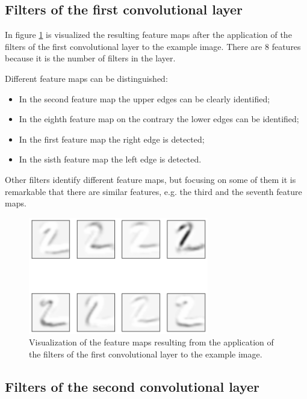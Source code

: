 \subsection{Filters of the first convolutional layer}

In figure \ref{fig:outputLev1} is visualized the resulting feature maps after the application of the filters of the first convolutional layer to the example image. There are $8$ features because it is the number of filters in the layer.

Different feature maps can be distinguished:
\begin{itemize}
	\item In the second feature map the upper edges can be clearly identified;
	\item In the eighth feature map on the contrary the lower edges can be identified;
	\item In the first feature map the right edge is detected;
	\item In the sisth feature map the left edge is detected.
\end{itemize}

Other filters identify different feature maps, but focusing on some of them it is remarkable that there are similar features, e.g. the third and the seventh feature maps.

\begin{figure}
	\centering
	\includegraphics[width=0.7\textwidth]{Images/conv_outputLev1_digit2}
	\caption{Visualization of the feature maps resulting from the application of the filters of the first convolutional layer to the example image.}
	\label{fig:outputLev1}
\end{figure}

\subsection{Filters of the second convolutional layer}

